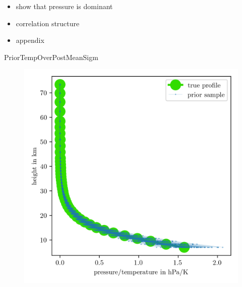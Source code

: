 \begin{itemize}
	\item show that pressure is dominant
	\item correlation structure
	\item appendix
\end{itemize}

PriorTempOverPostMeanSigm



\begin{figure}[ht!]
	\centering
	\includegraphics{PriorTempOverPostMeanSigm.png}
	\caption[]{}
	\label{fig:PriorPressOverTemp}
\end{figure}

